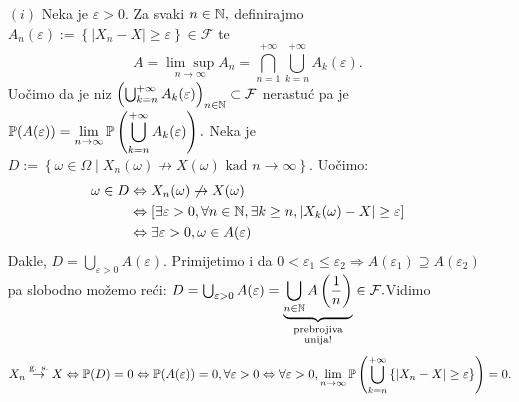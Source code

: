 \documentclass{article}
\newcommand{\mylimsup}{\underset{n\to\infty}{\lim\sup}}
\begin{document}
\begin{itemize}
    \item[\((i)\)] Neka je \(\varepsilon>0.\) Za svaki \(n\in\Bbb N,\) definirajmo \(A_n(\varepsilon):=\left\{|X_n-X|\ge\varepsilon\right\}\in\mathcal F\) te \[A=\mylimsup A_n=\bigcap_{n=1}^{+\infty}\bigcup_{k=n}^{+\infty}A_k(\varepsilon).\] Uočimo da je niz \(\left(\bigcup_{k=n}^{+\infty}A_k(\varepsilon)\right)_{n\in\Bbb N}\subset\mathcal F\) nerastuć pa je \(\displaystyle\Bbb P(A(\varepsilon))=\lim_{n\to\infty}\Bbb P\left(\bigcup_{k=n}^{+\infty}A_k(\varepsilon)\right).\)  Neka je \(D:=\left\{\omega\in\Omega\mid X_n(\omega)\not\to X(\omega)\text{ kad }n\to\infty\right\}.\) Uočimo: \[\begin{aligned}\omega\in D&\Leftrightarrow X_n(\omega)\not\to X(\omega)\\&\Leftrightarrow [\exists\varepsilon>0,\forall n\in\Bbb N,\exists k\ge n,|X_k(\omega)-X|\ge\varepsilon]\\&\Leftrightarrow \exists\varepsilon>0,\omega\in A(\varepsilon)\end{aligned}\] Dakle, \(\boxed{D=\bigcup_{\varepsilon>0}A(\varepsilon)}.\) Primijetimo i da \(0<\varepsilon_1\le\varepsilon_2\Rightarrow A(\varepsilon_1)\supseteq A(\varepsilon_2)\) pa slobodno možemo reći: \(D=\bigcup_{\varepsilon>0}A(\varepsilon)=\underbrace{\bigcup_{n\in\Bbb N}A\left(\frac1n\right)}_{\substack{\text{prebrojiva}\\\text{unija!}}}\in\mathcal F.\)\newline Vidimo \[X_n\overset{\text{g. s.}}{\to}X\Leftrightarrow \Bbb P(D)=0\Leftrightarrow\Bbb P(A(\varepsilon))=0,\forall\varepsilon>0\Leftrightarrow \forall\varepsilon>0,\lim\limits_{n\to\infty}\Bbb P\left(\bigcup_{k=n}^{+\infty}\left\{|X_n-X|\ge\varepsilon\right\}\right)=0.\]

\end{itemize}
\end{document}
